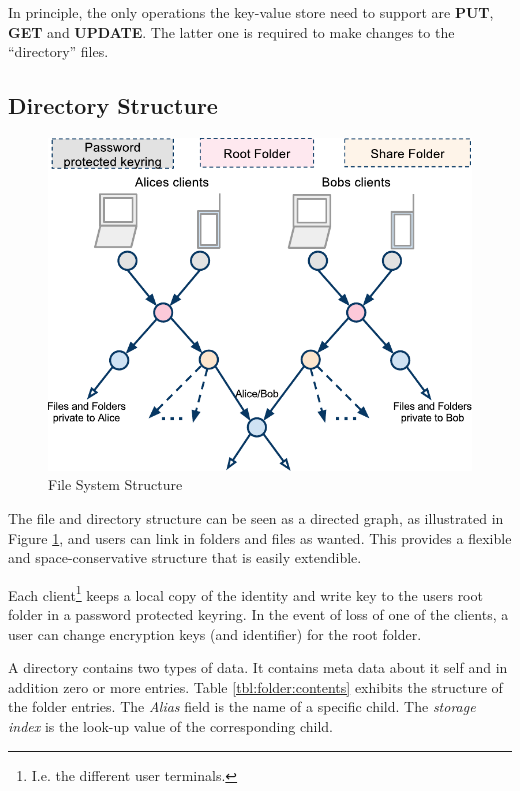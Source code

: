 \documentclass[pdftex,english,10pt,b5paper,twoside]{book}
\begin{document}
In principle, the only operations the key-value store need to support are
\textbf{PUT}, \textbf{GET} and \textbf{UPDATE}. The latter one is required to
make changes to the ``directory'' files.

\subsection{Directory Structure}

\begin{figure}[h!]
    \centering
    \includegraphics[width=\columnwidth]{ArchitectureFileSystem.pdf}
    \caption{File System Structure}
    \label{fig:AS:filesystem}
\end{figure}

The file and directory structure can be seen as a directed graph, as illustrated
in Figure \ref{fig:AS:filesystem}, and users can link in folders and files as
wanted. This provides a flexible and space-conservative structure that is easily
extendible.

Each client\footnote{I.e. the different user terminals.} keeps a local copy of
the identity and write key to the users root folder in a password
protected keyring. In the event of loss of one of the clients, a user can change
encryption keys (and identifier) for the root folder.



A directory contains two types of data. It contains meta data about it self and
in addition zero or more entries. Table \ref{tbl:folder:contents} exhibits the
structure of the folder entries. The \emph{Alias} field is the name of a
specific child. The \emph{storage index} is the look-up value of the
corresponding child.
\end{document}
